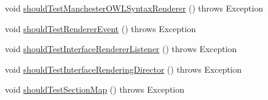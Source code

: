 \begin{DoxyCompactItemize}
\item 
void \hyperlink{classorg_1_1semanticweb_1_1owlapi_1_1contract_1_1_contract_mansyntaxrenderer_test_ac120aff86379a78bca6072b05b5971cf}{should\-Test\-Manchester\-O\-W\-L\-Syntax\-Renderer} ()  throws Exception 
\item 
void \hyperlink{classorg_1_1semanticweb_1_1owlapi_1_1contract_1_1_contract_mansyntaxrenderer_test_ae4841b9ba412d15f110cffbfb4dbfb5a}{should\-Test\-Renderer\-Event} ()  throws Exception 
\item 
void \hyperlink{classorg_1_1semanticweb_1_1owlapi_1_1contract_1_1_contract_mansyntaxrenderer_test_a99c29e2ef6de04fdcd78ef5d47067a19}{should\-Test\-Interface\-Renderer\-Listener} ()  throws Exception 
\item 
void \hyperlink{classorg_1_1semanticweb_1_1owlapi_1_1contract_1_1_contract_mansyntaxrenderer_test_a4cea237e736a11e8cd475b9c45d38a95}{should\-Test\-Interface\-Rendering\-Director} ()  throws Exception 
\item 
void \hyperlink{classorg_1_1semanticweb_1_1owlapi_1_1contract_1_1_contract_mansyntaxrenderer_test_a885843a0810cc5d7e65393e9c11d3572}{should\-Test\-Section\-Map} ()  throws Exception 
\end{DoxyCompactItemize}


